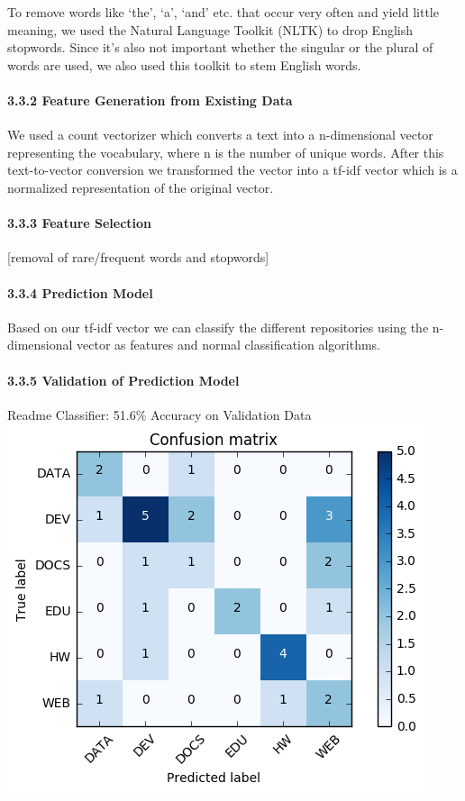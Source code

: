 \documentclass{article}
\begin{document}
To remove words like `the', `a', `and' etc. that occur very often and
yield little meaning, we used the Natural Language Toolkit (NLTK) to
drop English stopwords. Since it's also not important whether the
singular or the plural of words are used, we also used this toolkit to
stem English words.

\paragraph{3.3.2 Feature Generation from Existing
Data}\label{feature-generation-from-existing-data}

We used a count vectorizer which converts a text into a n-dimensional
vector representing the vocabulary, where n is the number of unique
words. After this text-to-vector conversion we transformed the vector
into a tf-idf vector which is a normalized representation of the
original vector.

\paragraph{3.3.3 Feature Selection}\label{feature-selection-1}

{[}removal of rare/frequent words and stopwords{]}

\paragraph{3.3.4 Prediction Model}\label{prediction-model-1}

Based on our tf-idf vector we can classify the different repositories
using the n-dimensional vector as features and normal classification
algorithms.

\paragraph{3.3.5 Validation of Prediction
Model}\label{validation-of-prediction-model-1}

Readme Classifier: 51.6\% Accuracy on Validation Data\\
\includegraphics{graphics/confusion-matrix-readme-classifier.png}
\end{document}
